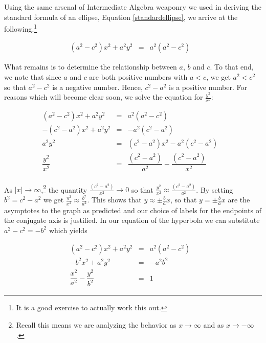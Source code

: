 \medskip

Using the same arsenal of Intermediate Algebra weaponry we used in deriving the standard formula of an ellipse, Equation \ref{standardellipse}, we arrive at the following.\footnote{It is a good exercise to actually work this out.} 

\[ \begin{array}{rclr} \left(a^2 - c^2\right) x^2 +a^2 y^2 & = & a^2 \left(a^2 - c^2\right)  & \end{array}\]

What remains is to determine the relationship between $a$, $b$ and $c$.  To that end, we note that since $a$ and $c$ are both positive numbers with $a < c$, we get $a^2 < c^2$ so that $a^2 - c^2$ is a negative number.  Hence, $c^2 - a^2$ is a positive number.  For reasons which will become clear soon, we solve the equation for $\frac{y^2}{x^2}$:
 
\[ \begin{array}{rclr} \left(a^2 - c^2\right) x^2 +a^2 y^2 & = & a^2 \left(a^2 - c^2\right)  & \\
-\left(c^2 - a^2\right) x^2 +a^2 y^2 & = & -a^2 \left(c^2 - a^2\right)  & \\
a^2 y^2 & = &  \left(c^2 - a^2\right) x^2 -  a^2\left(c^2 - a^2\right)& \\
\dfrac{y^2}{x^2} & = &  \dfrac{\left(c^2 - a^2\right)}{a^2} -  \dfrac{\left(c^2 - a^2\right)}{x^2}& \\ \end{array}\]

As $|x| \rightarrow \infty$,\footnote{Recall this means we are analyzing the behavior as $x \rightarrow \infty$ and as $x \rightarrow -\infty$.}  the quantity $\frac{\left(c^2 - a^2\right)}{x^2} \rightarrow 0$ so that $\frac{y^2}{x^2} \approx  \frac{\left(c^2 - a^2\right)}{a^2}$.  By setting $b^{2} = c^{2} - a^{2}$ we get 
$\frac{y^2}{x^2}  \approx  \frac{b^2}{a^2}$.  This shows that $y  \approx \pm \frac{b}{a} x$, so that $y = \pm \frac{b}{a} x$ are the asymptotes to the graph as predicted and our choice of labels for the endpoints of the conjugate axis is justified.  In our equation of the hyperbola we can substitute $a^2 - c^2 = -b^2$ which yields 

\[ \begin{array}{rclr} \left(a^2 - c^2\right) x^2 +a^2 y^2 & = & a^2 \left(a^2 - c^2\right)  &\\
-b^2 x^2 +a^2 y^2 & = & - a^2 b^2  & \\
\dfrac{x^2}{a^2} - \dfrac{y^2}{b^2} & = & 1 & \end{array} \]

